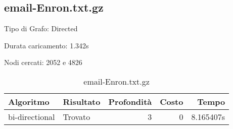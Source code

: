 \subsection{email-Enron.txt.gz}
Tipo di Grafo: Directed

Durata caricamento: 1.342s

Nodi cercati: 2052 e 4826

\begin{table}[h]
\centering
\begin{tabular}{|l|l|r|r|r|}
\hline
\textbf{Algoritmo} & \textbf{Risultato} & \textbf{Profondità} & \textbf{Costo} & \textbf{Tempo} \\
 \hline
bi-directional & Trovato & 3 & 0 & 8.165407s \\
\hline
\end{tabular}
\caption{email-Enron.txt.gz}
\end{table}
